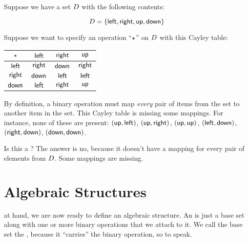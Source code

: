 \documentclass[../../../main.tex]{subfiles}
\begin{document}
\begin{example}

Suppose we have a set $D$ with the following contents:

\begin{equation*}
  D = \{ \mathsf{left}, \mathsf{right}, \mathsf{up}, \mathsf{down} \}
\end{equation*}

Suppose we want to specify an operation ``$\opSymbol/$'' on $D$ with this Cayley table:

\begin{center}
  \begin{tabular}{| c || c | c | c | }
    \hline
    $\opSymbol/$ & $\mathsf{left}$  & $\mathsf{right}$ & $\mathsf{up}$    \\ \hline \hline
    $\mathsf{left}$   & $\mathsf{right}$ & $\mathsf{down}$  & $\mathsf{right}$ \\ \hline
    $\mathsf{right}$  & $\mathsf{down}$  & $\mathsf{left}$  & $\mathsf{left}$  \\ \hline
    $\mathsf{down}$   & $\mathsf{left}$  & $\mathsf{right}$ & $\mathsf{up}$    \\ \hline
  \end{tabular}
\end{center}

\begin{aside}
  \begin{remark}
    By definition, a binary operation must map \emph{every} pair of items from the set to another item in the set. This Cayley table is missing some mappings. For instance, none of these are present: $(\mathsf{up}, \mathsf{left})$, $(\mathsf{up}, \mathsf{right})$, $(\mathsf{up}, \mathsf{up})$, $(\mathsf{left}, \mathsf{down})$, $(\mathsf{right}, \mathsf{down})$, $(\mathsf{down}, \mathsf{down})$.
  \end{remark}
\end{aside}

Is this a ? The answer is no, because it doesn't have a mapping for every pair of elements from $D$. Some mappings are missing.

\end{example}


\section{Algebraic Structures}

 at hand, we are now ready to define an algebraic structure. An  is just a base set along with one or more binary operations that we attach to it. We call the base set the , because it ``carries'' the binary operation, so to speak.
\end{document}
